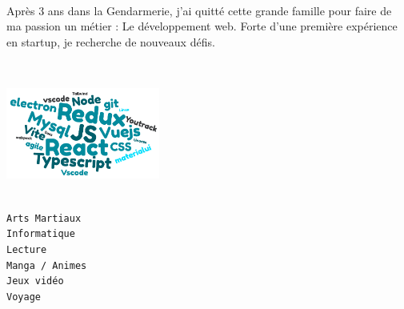 \documentclass[lighthipster]{main-classes}
\begin{document}
\begin{paracol}{2}
    
    \paracolbackgroundoptions
    
    \footnotesize
    {\setasidefontcolour
    \flushright
    \begin{center}
    \end{center}
    
    \\[0.5em]
    
    {Après 3 ans dans la Gendarmerie, j'ai quitté cette grande famille pour faire de ma passion un métier : Le développement web. Forte d'une première expérience en startup, je recherche de nouveaux défis.}

    \vspace{1em}
    
    \bigskip
    \\[0.5em]
        \centerline{\includegraphics[height=3cm]{images/nuage-de-mots.png}}
    \bigskip

    \vspace{1em}
    
    \\[0.5em]
    
    \texttt{Arts Martiaux} \\
    \vspace{0.25em}
    \texttt{Informatique} \\
    \vspace{0.25em}
    \texttt{Lecture} \\
    \vspace{0.25em}
    \texttt{Manga / Animes} \\
    \vspace{0.25em}
    \texttt{Jeux vidéo} \\
    \vspace{0.25em}
    \texttt{Voyage}
    \bigskip
    
    \vspace{1em}
    
    \\[0.5em]
    \vspace{1em}
    
}
\end{paracol}
\end{document}
